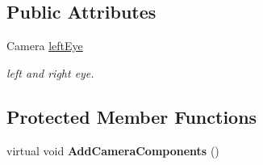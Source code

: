 \subsection*{Public Attributes}
\begin{DoxyCompactItemize}
\item 
Camera \mbox{\hyperlink{class_ximmerse_1_1_slide_in_s_d_k_1_1_a_r_camera_a679b916260958168640c6630758b8ab3}{left\+Eye}}
\begin{DoxyCompactList}\small\item\em left and right eye. \end{DoxyCompactList}\end{DoxyCompactItemize}
\subsection*{Protected Member Functions}
\begin{DoxyCompactItemize}
\item 
\mbox{\label{class_ximmerse_1_1_slide_in_s_d_k_1_1_a_r_camera_a9c2c5e4b9206f51ab4bbfa5cb79864d5}} 
virtual void {\bfseries Add\+Camera\+Components} ()
\end{DoxyCompactItemize}

